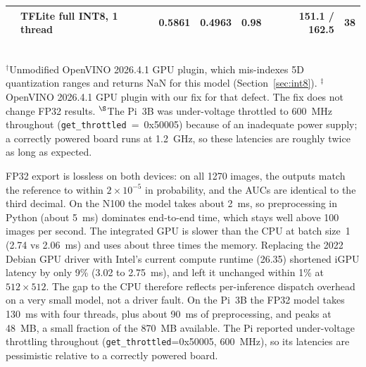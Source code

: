 \documentclass[a4paper,fleqn]{cas-sc}
\begin{document}
\begin{table}[width=\linewidth,cols=7,pos=h]
\begin{tabular*}{\tblwidth}{@{} LLRRRRR@{} }
 & TFLite full INT8, 1 thread & 0.5861 & 0.4963 & 0.98 & 151.1 / 162.5 & 38 \\
\bottomrule
\end{tabular*}
\\[2pt]{\footnotesize $^{\dagger}$Unmodified OpenVINO 2026.4.1 GPU plugin,
which mis-indexes 5D quantization ranges and returns NaN for this model
(Section~\ref{sec:int8}).
$^{\ddagger}$OpenVINO 2026.4.1 GPU plugin with our fix for that defect.
The fix does not change FP32 results. $^{\S}$The Pi~3B was under-voltage throttled to 600~MHz throughout (\texttt{get\_throttled}~=~0x50005) because of an inadequate power supply; a correctly powered board runs at 1.2~GHz, so these latencies are roughly twice as long as expected.}
\end{table}

FP32 export is lossless on both devices: on all 1270 images, the outputs
match the reference to within $2\times10^{-5}$ in probability, and the AUCs
are identical to the third decimal. On the N100 the model takes about
2~ms, so preprocessing in Python (about 5~ms) dominates end-to-end time,
which stays well above 100 images per second. The integrated GPU is slower
than the CPU at batch size~1 (2.74 vs 2.06~ms) and uses about three times
the memory.
Replacing the 2022 Debian GPU driver with Intel's current compute runtime
(26.35) shortened iGPU latency by only 9\% (3.02 to 2.75~ms), and left it
unchanged within 1\% at $512\times512$. The gap to the CPU therefore
reflects per-inference dispatch overhead on a very small model, not a
driver fault.
On the Pi~3B the FP32 model takes 130~ms with four threads, plus about
90~ms of preprocessing, and peaks at 48~MB, a small fraction of the 870~MB
available. The Pi reported under-voltage throttling throughout
(\texttt{get\_throttled}=0x50005, 600~MHz), so its latencies are
pessimistic relative to a correctly powered board.
\end{document}
